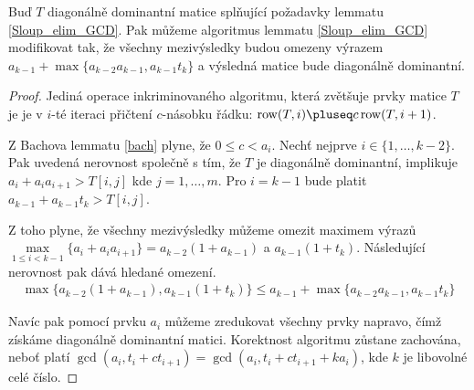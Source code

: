 \begin{lem} \label{Sloup_elim_GCD_modified}
Buď $ T $ diagonálně dominantní matice splňující požadavky lemmatu \ref{Sloup_elim_GCD}.
Pak můžeme algoritmus lemmatu \ref{Sloup_elim_GCD} modifikovat tak, že všechny
mezivýsledky budou omezeny výrazem 
$ a_{k - 1} + \max \{ a_{k - 2} a_{k - 1}, a_{k - 1} t_k \} $ 
a výsledná matice bude diagonálně dominantní.
\end{lem}
\begin{proof}
Jediná operace inkriminovaného algoritmu, která zvětšuje prvky matice $ T $ je
je v $ i $-té iteraci přičtení $ c $-násobku řádku: 
$ \operatorname{row}(T, i) \pluseq c \operatorname{row}(T, i + 1) $.

Z Bachova lemmatu \ref{bach} plyne, že $ 0 \leq c < a_i $. 
Nechť nejprve $ i \in \{1, \dots, k - 2 \} $. Pak uvedená nerovnost společně s
tím, že $ T $ je diagonálně dominantní, implikuje $ a_i + a_i a_{i+1} > T[i, j] $ kde
$ j = 1, \dots, m $. Pro $ i = k - 1 $ bude platit $ a_{k-1} + a_{k - 1} t_k > T[i, j] $.

Z toho plyne, že všechny mezivýsledky můžeme omezit maximem výrazů
$ \max\limits_{1 \leq i < k - 1}\{ a_i + a_i a_{i+1} \} = a_{k - 2} ( 1 + a_{k - 1} )$ 
a $ a_{k - 1} ( 1 + t_k )$. Následující nerovnost pak dává hledané omezení.
\begin{align*}
    \max \{ a_{k - 2} ( 1 + a_{k - 1}),  a_{k - 1} ( 1 + t_k ) \} 
        \leq  a_{k - 1} + \max \{ a_{k - 2} a_{k - 1}, a_{k - 1} t_k \}
\end{align*}

Navíc pak pomocí prvku
$ a_i $ můžeme zredukovat všechny prvky napravo, čímž získáme diagonálně dominantní
matici. Korektnost algoritmu zůstane zachována, neboť platí
$ \gcd(a_i, t_{i} + ct_{i+1}) = \gcd(a_i, t_{i} + ct_{i+1} + k a_i) $,
kde $ k $ je libovolné celé číslo.
\end{proof}




